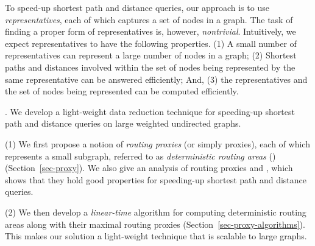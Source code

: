 To speed-up shortest  path and distance queries, our approach is to use {\em representatives}, each of which captures a set of nodes in a graph. The task of finding a proper form of representatives is, however, {\em nontrivial}. Intuitively, we expect representatives to have the following properties.
%
(1) A small number of representatives can represent a large number of nodes in a graph;
%
(2) Shortest paths and distances involved within the set of nodes being represented by the same representative can be answered efficiently; And,
%
(3) the representatives and the set of nodes being represented can be computed efficiently.


. We develop a light-weight data reduction technique for speeding-up shortest  path and distance queries on large weighted undirected graphs.

\stab (1) We first propose a notion of {\em routing proxies} (or simply proxies), each of which represents a small subgraph, referred to as  {\em deterministic routing areas} (\dras)  (Section~\ref{sec-proxy}). We also give an analysis of routing proxies and \dras, which shows that they hold good properties for speeding-up shortest path and distance queries.

\stab (2) We then develop a {\em linear-time} algorithm for computing deterministic routing areas along with their maximal routing proxies (Section~\ref{sec-proxy-algorithms}). This makes our solution a light-weight technique that is scalable to large graphs.



